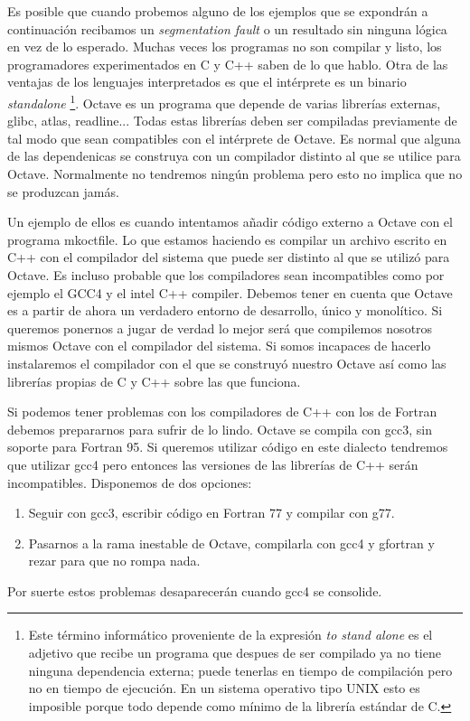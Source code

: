 Es posible que cuando probemos alguno de los ejemplos que se expondrán
a continuación recibamos un \emph{segmentation fault} o un resultado
sin ninguna lógica en vez de lo esperado. Muchas veces los programas
no son compilar y listo, los programadores experimentados en C y C++
saben de lo que hablo. Otra de las ventajas de los lenguajes
interpretados es que el intérprete es un binario \emph{standalone}%
\footnote{Este término informático proveniente de la expresión
  \emph{to stand alone} es el adjetivo que recibe un programa que
  despues de ser compilado ya no tiene ninguna dependencia externa;
  puede tenerlas en tiempo de compilación pero no en tiempo de
  ejecución. En un sistema operativo tipo UNIX esto es imposible
  porque todo depende como mínimo de la librería estándar de C.%
}. Octave es un programa que depende de varias librerías
externas, glibc, atlas, readline... Todas estas librerías deben ser
compiladas previamente de tal modo que sean compatibles con el
intérprete de Octave. Es normal que alguna de las dependenicas se
construya con un compilador distinto al que se utilice para Octave.
Normalmente no tendremos ningún problema pero esto no implica que no
se produzcan jamás.

Un ejemplo de ellos es cuando intentamos añadir código externo a
Octave con el programa mkoctfile. Lo que estamos haciendo es compilar
un archivo escrito en C++ con el compilador del sistema que puede ser
distinto al que se utilizó para Octave. Es incluso probable que los
compiladores sean incompatibles como por ejemplo el GCC4 y el intel
C++ compiler. Debemos tener en cuenta que Octave es a partir de ahora
un verdadero entorno de desarrollo, único y monolítico. Si queremos
ponernos a jugar de verdad lo mejor será que compilemos nosotros
mismos Octave con el compilador del sistema. Si somos incapaces de
hacerlo instalaremos el compilador con el que se construyó nuestro
Octave así como las librerías propias de C y C++ sobre las que
funciona.

Si podemos tener problemas con los compiladores de C++ con los de
Fortran debemos prepararnos para sufrir de lo lindo. Octave se compila
con gcc3, sin soporte para Fortran 95. Si queremos utilizar código en
este dialecto tendremos que utilizar gcc4 pero entonces las versiones
de las librerías de C++ serán incompatibles. Disponemos de dos
opciones:

\begin{enumerate}
\item Seguir con gcc3, escribir código en Fortran 77 y compilar con
  g77.
\item Pasarnos a la rama inestable de Octave, compilarla con gcc4 y
  gfortran y rezar para que no rompa nada.
\end{enumerate}
Por suerte estos problemas desaparecerán cuando gcc4 se consolide.


